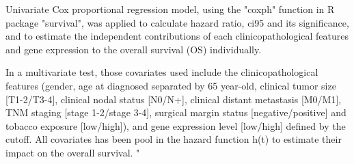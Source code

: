 \documentclass[preprint,12pt]{elsarticle}
\newenvironment{MyColorPar}[1]{%
    \leavevmode\color{#1}\ignorespaces%
}{%
}%
\begin{document}
\begin{MyColorPar}{blue}
\begin{MyColorPar}{red}
Univariate Cox proportional regression model, using the "coxph" function in R package "survival", was applied to calculate hazard ratio, \acrfull{ci95} and its significance, and to estimate the independent contributions of each clinicopathological features and gene expression to the overall survival (OS) individually.


In a multivariate test, those covariates used include the clinicopathological features (gender, age at diagnosed separated by 65 year-old, clinical tumor size [T1-2/T3-4], clinical nodal status [N0/N+], clinical distant metastasis [M0/M1], TNM staging [stage 1-2/stage 3-4], surgical margin status [negative/positive] and tobacco exposure [low/high]), and gene expression level [low/high] defined by the cutoff.
All covariates has been pool in the hazard function h(t) to estimate their impact on the overall survival.
"
\end{MyColorPar}


\end{MyColorPar}%












\end{document}
